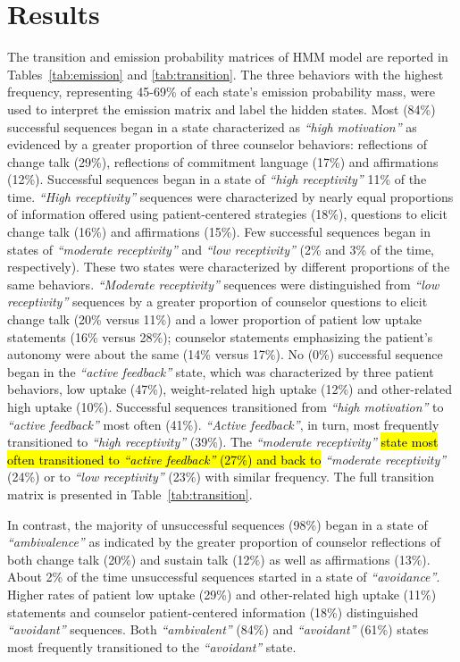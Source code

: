 \section{Results}
\label{sec:results}
The transition and emission probability matrices of HMM model are reported in Tables~\ref{tab:emission} and \ref{tab:transition}. The three behaviors with the highest frequency, representing 45-69\% of each state's emission probability mass, were used to interpret the emission matrix and label the hidden states. Most (84\%) successful sequences began in a state characterized as \textit{``high motivation''} as evidenced by a greater proportion of three counselor behaviors: reflections of change talk (29\%), reflections of commitment language (17\%) and affirmations (12\%). Successful sequences began in a state of \textit{``high receptivity''} 11\% of the time. \textit{``High receptivity''} sequences were characterized by nearly equal proportions of information offered using patient-centered strategies (18\%), questions to elicit change talk (16\%) and affirmations (15\%). Few successful sequences began in states of \textit{``moderate receptivity''} and \textit{``low receptivity''} (2\% and 3\% of the time, respectively). These two states were characterized by different proportions of the same behaviors. \textit{``Moderate receptivity''} sequences were distinguished from \textit{``low receptivity''} sequences by a greater proportion of counselor questions to elicit change talk (20\% versus 11\%) and a lower proportion of patient low uptake statements (16\% versus 28\%); counselor statements emphasizing the patient's autonomy were about the same (14\% versus 17\%). No (0\%) successful sequence began in the \textit{``active feedback''} state, which was characterized by three patient behaviors, low uptake (47\%), weight-related high uptake (12\%) and other-related high uptake (10\%). Successful sequences transitioned from \textit{``high motivation''} to \textit{``active feedback''} most often (41\%). \textit{``Active feedback''}, in turn, most frequently transitioned to \textit{``high receptivity''} (39\%). The \textit{``moderate receptivity''} \hl{state most often transitioned to \textit{``active feedback''} (27\%) and back to} \textit{``moderate receptivity''} (24\%) or to \textit{``low receptivity''} (23\%) with similar frequency. The full transition matrix is presented in Table~\ref{tab:transition}.

In contrast, the majority of unsuccessful sequences (98\%) began in a state of \textit{``ambivalence''} as indicated by the greater proportion of counselor reflections of both change talk (20\%) and sustain talk (12\%) as well as affirmations (13\%). About 2\% of the time unsuccessful sequences started in a state of \textit{``avoidance''}. Higher rates of patient low uptake (29\%) and other-related high uptake (11\%) statements and counselor patient-centered information (18\%) distinguished \textit{``avoidant''} sequences. Both \textit{``ambivalent''} (84\%) and \textit{``avoidant''} (61\%) states most frequently transitioned to the \textit{``avoidant''} state.

